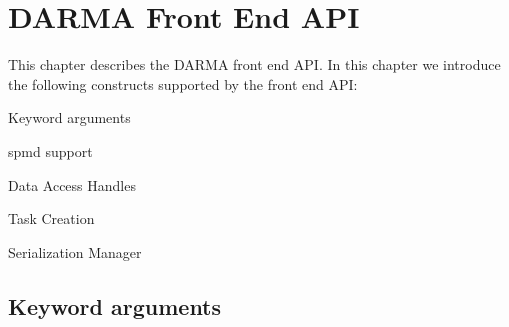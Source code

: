 
\chapter{DARMA Front End API}
\label{chap:front_end}
This chapter describes the DARMA \gls{front end} \gls{API}. In this chapter we
introduce the following constructs supported by the \gls{front end} \gls{API}:
\begin{compactitem}
\item Keyword arguments
\item \gls{spmd} support
\item Data Access Handles
\item Task Creation
\item Serialization Manager
\end{compactitem}

\section{Keyword arguments}
\label{sec:keyword}

